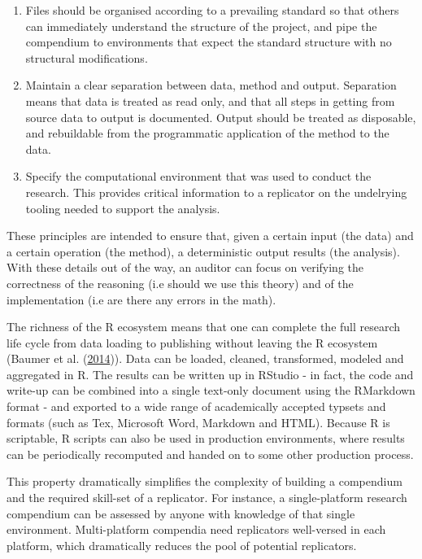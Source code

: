 \documentclass[11pt,preprint, authoryear]{elsarticle}
\numberwithin{equation}{section}
\numberwithin{figure}{section}
\numberwithin{table}{section}
\def\tightlist{} %
\begin{document}
\begin{enumerate}
\def\labelenumi{\arabic{enumi}.}
\tightlist
\item
  Files should be organised according to a prevailing standard so that
  others can immediately understand the structure of the project, and
  pipe the compendium to environments that expect the standard structure
  with no structural modifications.
\item
  Maintain a clear separation between data, method and output.
  Separation means that data is treated as read only, and that all steps
  in getting from source data to output is documented. Output should be
  treated as disposable, and rebuildable from the programmatic
  application of the method to the data.
\item
  Specify the computational environment that was used to conduct the
  research. This provides critical information to a replicator on the
  undelrying tooling needed to support the analysis.
\end{enumerate}

These principles are intended to ensure that, given a certain input (the
data) and a certain operation (the method), a deterministic output
results (the analysis). With these details out of the way, an auditor
can focus on verifying the correctness of the reasoning (i.e should we
use this theory) and of the implementation (i.e are there any errors in
the math).

The richness of the R ecosystem means that one can complete the full
research life cycle from data loading to publishing without leaving the
R ecosystem (Baumer et al. (\protect\hyperlink{ref-Baumer2014}{2014})).
Data can be loaded, cleaned, transformed, modeled and aggregated in R.
The results can be written up in RStudio - in fact, the code and
write-up can be combined into a single text-only document using the
RMarkdown format - and exported to a wide range of academically accepted
typsets and formats (such as Tex, Microsoft Word, Markdown and HTML).
Because R is scriptable, R scripts can also be used in production
environments, where results can be periodically recomputed and handed on
to some other production process.

This property dramatically simplifies the complexity of building a
compendium and the required skill-set of a replicator. For instance, a
single-platform research compendium can be assessed by anyone with
knowledge of that single environment. Multi-platform compendia need
replicators well-versed in each platform, which dramatically reduces the
pool of potential replicators.
\end{document}
